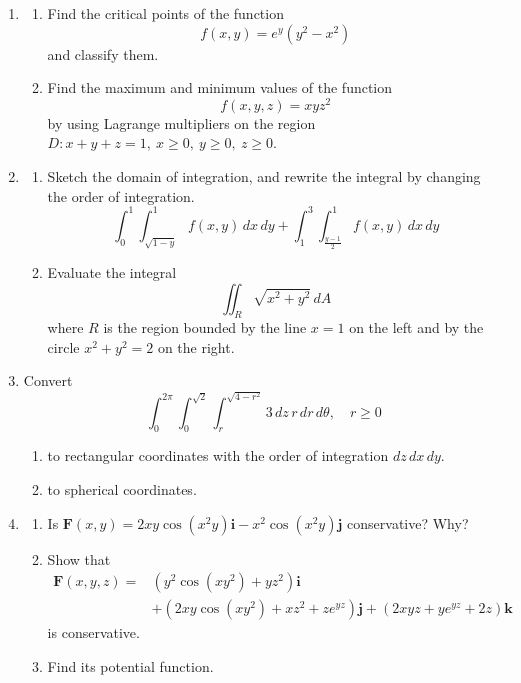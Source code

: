 \documentclass[a4paper, 12pt]{article}
\begin{document}
\begin{enumerate}[leftmargin=*,label=\textbf{\arabic*.}]
\item \begin{enumerate}[leftmargin=*,label=\textbf{\alph*.}]
\item Find the critical points of the function
\[f(x,y)={e}^y\left(y^2-x^2\right)\]
and classify them.
\item Find the maximum and minimum values of the function
\[f(x,y,z)=xyz^2\]
by using Lagrange multipliers on the region $D:x+y+z=1,\:x\geq0,\:y\geq0,\:z\geq0$.
\end{enumerate}

\item \begin{enumerate}[leftmargin=*,label=\textbf{\alph*.}]
\item Sketch the domain of integration, and rewrite the integral by changing the order of integration.
\[\int_0^1\int_{\sqrt{1-y}}^1f(x,y)\,dx\,dy+\int_1^3\int_{\textstyle\frac{y-1}2}^1f(x,y)\,dx\,dy\]

\item Evaluate the integral
\[\iint_R\sqrt{x^2+y^2}\,dA\]
where $R$ is the region bounded by the line $x=1$ on the left and by the circle $x^2+y^2=2$ on the right.
\end{enumerate}

\item Convert
\[\int_0^{2\pi}\int_0^{\sqrt2}\int_r^{\sqrt{4-r^2}}3\,dz\,r\,dr\,d\theta,\quad r\geq0\]

\begin{enumerate}[leftmargin=*,label=\textbf{\alph*.}]
\item to rectangular coordinates with the order of integration $dz\,dx\,dy$.
\item to spherical coordinates.
\end{enumerate}

\item \begin{enumerate}[leftmargin=*,label=\textbf{\alph*.}]
\item Is $\mathbf{F}(x,y)=2xy\cos\left(x^2y\right)\mathbf{i}-x^2\cos\left(x^2y\right)\mathbf{j}$ conservative? Why?
\item Show that
\begin{align*}\mathbf{F}(x,y,z)=&\left(y^2\cos\left(xy^2\right)+yz^2\right)\mathbf{i}\\&+\left(2xy\cos\left(xy^2\right)+xz^2+z{e}^{yz}\right)\mathbf{j}+\left(2xyz+y{e}^{yz}+2z\right)\mathbf{k}\end{align*}
is conservative.
\item Find its potential function.
\end{enumerate}
\end{enumerate}
\end{document}
